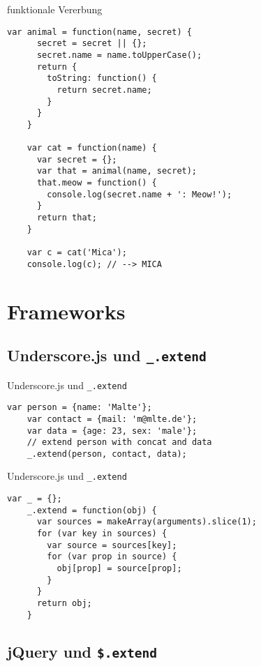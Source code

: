 \begin{frame}[fragile]{funktionale Vererbung}
  \begin{lstlisting}[gobble=4]
    var animal = function(name, secret) {
      secret = secret || {};
      secret.name = name.toUpperCase();
      return {
        toString: function() {
          return secret.name;
        }
      }
    }
    
    var cat = function(name) {
      var secret = {};
      var that = animal(name, secret);
      that.meow = function() {
        console.log(secret.name + ': Meow!');
      }
      return that;
    }
    
    var c = cat('Mica');
    console.log(c); // --> MICA
  \end{lstlisting}
\end{frame}

\section{Frameworks}

\subsection{Underscore.js und \texttt{\_.extend}}

\begin{frame}[fragile]{Underscore.js und \texttt{\_.extend}}
  \begin{lstlisting}[basicstyle=\ttfamily,gobble=4]
    var person = {name: 'Malte'};
    var contact = {mail: 'm@mlte.de'};
    var data = {age: 23, sex: 'male'};
    // extend person with concat and data
    _.extend(person, contact, data);
  \end{lstlisting}
\end{frame}

\begin{frame}[fragile]{Underscore.js und \texttt{\_.extend}}
  \begin{lstlisting}[basicstyle=\ttfamily,gobble=4]
    var _ = {};
    _.extend = function(obj) {
      var sources = makeArray(arguments).slice(1);
      for (var key in sources) {
        var source = sources[key];
        for (var prop in source) {
          obj[prop] = source[prop];
        }
      }
      return obj;
    }
  \end{lstlisting}
\end{frame}

\subsection{jQuery und \texttt{\$.extend}}

